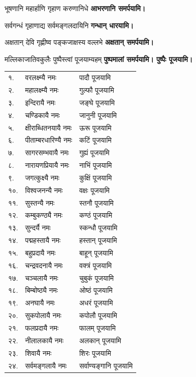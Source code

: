 \begin{center}
{भूषणानि महार्हाणि गृहाण करुणानिधे}
\textbf{\devAya{} आभरणानि समर्पयामि।}
\medskip

{सर्वगन्धं गृहाणाद्य सर्वमङ्गलदायिनि}
\textbf{\devAya{} गन्धान् धारयामि।}
\medskip

{अक्षतान् देवि गृह्णीष्व पङ्कजाक्षस्य वल्लभे}
\textbf{\devAya{} अक्षतान् समर्पयामि।}
\medskip

{मल्लिकाजातिवकुलैः पुष्पैस्त्वां पूजयाम्यहम्}
\textbf{\devAya{} पुष्पमालां समर्पयामि। पुष्पैः पूजयामि।}
\medskip

\end{center}

\begin{longtable}{ll@{—}l}
१. & वरलक्ष्म्यै नमः & पादौ पूजयामि\\
२. & महालक्ष्म्यै नमः & गुल्फौ पूजयामि\\
३. & इन्दिरायै नमः & जङ्घे पूजयामि\\
४. & चण्डिकायै नमः & जानुनी पूजयामि\\
५. & क्षीराब्धितनयायै नमः & ऊरू पूजयामि\\
६. & पीताम्बरधारिण्यै नमः & कटिं पूजयामि\\
७. & सागरसम्भवायै नमः & गुह्यं पूजयामि\\
८. & नारायणप्रियायै नमः & नाभिं पूजयामि\\
९. & जगत्कुक्ष्यै नमः & कुक्षिं पूजयामि\\
१०. & विश्वजनन्यै नमः & वक्षः पूजयामि\\
११. & सुस्तन्यै नमः & स्तनौ पूजयामि\\
१२. & कम्बुकण्ठ्यै नमः & कण्ठं पूजयामि\\
१३. & सुन्दर्यै नमः & स्कन्धौ पूजयामि\\
१४. & पद्महस्तायै नमः & हस्तान् पूजयामि\\
१५. & बहुप्रदायै नमः & बाहून् पूजयामि\\
१६. & चन्द्रवदनायै नमः & वक्त्रं पूजयामि\\
१७. & चञ्चलायै नमः & चुबुकं पूजयामि\\
१८. & बिम्बोष्ठ्यै नमः & ओष्ठं पूजयामि\\
१९. & अनघायै नमः & अधरं पूजयामि\\
२०. & सुकपोलायै नमः & कपोलौ पूजयामि\\
२१. & फलप्रदायै नमः & फालम् पूजयामि\\
२२. & नीलालकायै नमः & अलकान् पूजयामि\\
२३. & शिवायै नमः & शिरः पूजयामि\\
२४. & सर्वमङ्गलायै नमः & सर्वाण्यङ्गानि पूजयामि\\
\end{longtable}

